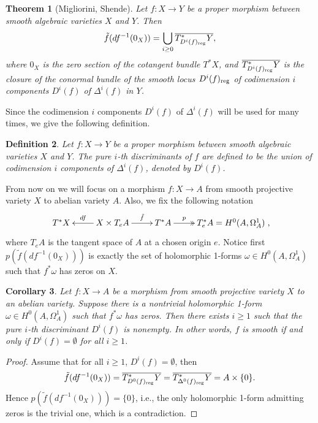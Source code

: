 \documentclass[a4paper,12pt,reqno]{amsart}
\newtheorem{theorem}{Theorem}[section]
\theoremstyle{plain}
\newtheorem{corollary}[theorem]{Corollary}
\newtheorem{definition}[theorem]{Definition}
\theoremstyle{remark}
\begin{document}
\begin{theorem}[Migliorini, Shende]\label{MiSh}
Let $f: X\to Y$ be a proper morphism between smooth algebraic varieties $X$ and $Y$. Then $$\tilde{f}(df^{-1}(0_X))=\bigcup_{i\geq0}\overline{T^*_{D^i(f)_{\textnormal{reg}}}Y},$$ where $0_X$ is the zero section of the cotangent bundle $T^*X$, and $\overline{T^*_{D^i(f)_{\textnormal{reg}}}Y}$ is the closure of the conormal bundle of the smooth locus $D^i(f)_{\textnormal{reg}}$ of codimension $i$ components  $D^i(f)$ of $\Delta^i(f)$ in $Y$.
\end{theorem}

Since the codimension $i$ components $D^i(f)$ of $\Delta^i(f)$ will be used for many times, we give the following definition.

\begin{definition}
Let $f: X\to Y$ be a proper morphism between smooth algebraic varieties $X$ and $Y$. The pure $i$-th discriminants of $f $ are defined to be
the union of codimension $i$ components of $\Delta^i(f)$, denoted by $D^i(f)$.
\end{definition}

From now on we will focus on a morphism $f: X\to A$ from smooth projective variety $X$ to abelian variety $A$. Also, we fix the following notation
$$\xymatrix{
T^*X
& X\times T_eA \ar[l]_-{df} \ar[r]^-{\tilde{f}} &T^*A\ar@{->>}[r]^-p& T^*_e A=H^0(A, \Omega_A^1)
},$$ where $T_eA$ is the tangent space of $A$ at a chosen origin $e$. Notice first $p(\tilde{f}(df^{-1}(0_X)))$ is exactly the set of holomorphic 1-forms $\omega\in H^0(A, \Omega_A^1)$ such that $f^*\omega$ has zeros on $X$.

\begin{corollary}\label{Cor:MiShCor}
Let $f: X\to A$ be a morphism from smooth projective variety $X$ to an abelian variety. Suppose there is a nontrivial holomorphic 1-form $\omega\in H^0(A, \Omega_A^1)$ such that $f^*\omega$ has zeros. Then there exists $i\geq1$ such that the pure $i$-th discriminant $D^i(f)$ is nonempty. In other words, $f$ is smooth if and only if $D^i(f)=\emptyset$ for all $i\geq 1$.
\end{corollary}

\begin{proof}
Assume that for all $i\geq 1$, $D^i(f)=\emptyset$, then $$\tilde{f}(df^{-1}(0_X))=\overline{T^*_{D^0(f)_{\textnormal{reg}}}Y}=\overline{T^*_{\Delta^0(f)_{\textnormal{reg}}}Y}=A\times \{0\}.$$ Hence $p(\tilde{f}(df^{-1}(0_X)))=\{0\}$, i.e., the only holomorphic 1-form admitting zeros is the trivial one, which is a contradiction.
\end{proof}
\end{document}
